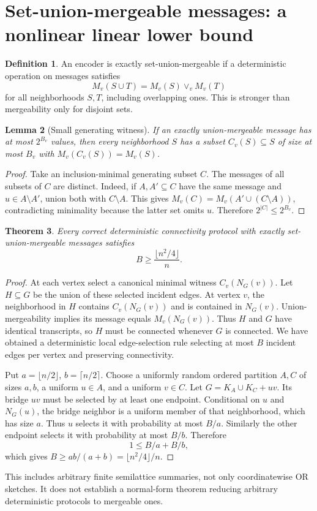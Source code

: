 \documentclass[11pt]{article}
\newtheorem{theorem}{Theorem}[section]
\newtheorem{lemma}[theorem]{Lemma}
\theoremstyle{definition}\newtheorem{definition}[theorem]{Definition}
\theoremstyle{remark}\newtheorem{remark}[theorem]{Remark}
\begin{document}
\section{Set-union-mergeable messages: a nonlinear linear lower bound}
\begin{definition}
An encoder is exactly set-union-mergeable if a deterministic operation on messages satisfies
\[
 M_v(S\cup T)=M_v(S)\vee_v M_v(T)
\]
for all neighborhoods $S,T$, including overlapping ones. This is stronger than mergeability only for disjoint sets.
\end{definition}

\begin{lemma}[Small generating witness]
If an exactly union-mergeable message has at most $2^{B_v}$ values, then every neighborhood $S$ has a subset $C_v(S)\subseteq S$ of size at most $B_v$ with $M_v(C_v(S))=M_v(S)$.
\end{lemma}
\begin{proof}
Take an inclusion-minimal generating subset $C$. The messages of all subsets of $C$ are distinct. Indeed, if $A,A'\subseteq C$ have the same message and $u\in A\setminus A'$, union both with $C\setminus A$. This gives $M_v(C)=M_v(A'\cup(C\setminus A))$, contradicting minimality because the latter set omits $u$. Therefore $2^{|C|}\le2^{B_v}$.
\end{proof}

\begin{theorem}\label{thm:union}
Every correct deterministic connectivity protocol with exactly set-union-mergeable messages satisfies
\[
 B\ge\frac{\lfloor n^2/4\rfloor}{n}.
\]
\end{theorem}
\begin{proof}
At each vertex select a canonical minimal witness $C_v(N_G(v))$. Let $H\subseteq G$ be the union of these selected incident edges. At vertex $v$, the neighborhood in $H$ contains $C_v(N_G(v))$ and is contained in $N_G(v)$. Union-mergeability implies its message equals $M_v(N_G(v))$. Thus $H$ and $G$ have identical transcripts, so $H$ must be connected whenever $G$ is connected. We have obtained a deterministic local edge-selection rule selecting at most $B$ incident edges per vertex and preserving connectivity.

Put $a=\lfloor n/2\rfloor$, $b=\lceil n/2\rceil$. Choose a uniformly random ordered partition $A,C$ of sizes $a,b$, a uniform $u\in A$, and a uniform $v\in C$. Let $G=K_A\cup K_C+uv$. Its bridge $uv$ must be selected by at least one endpoint. Conditional on $u$ and $N_G(u)$, the bridge neighbor is a uniform member of that neighborhood, which has size $a$. Thus $u$ selects it with probability at most $B/a$. Similarly the other endpoint selects it with probability at most $B/b$. Therefore
\[
 1\le B/a+B/b,
\]
which gives $B\ge ab/(a+b)=\lfloor n^2/4\rfloor/n$.
\end{proof}
This includes arbitrary finite semilattice summaries, not only coordinatewise OR sketches. It does not establish a normal-form theorem reducing arbitrary deterministic protocols to mergeable ones.
\end{document}

